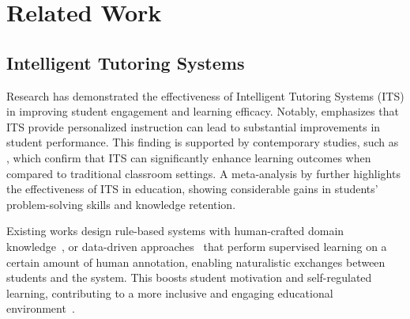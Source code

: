 \section{Related Work}
\subsection{Intelligent Tutoring Systems}
Research has demonstrated the effectiveness of Intelligent Tutoring Systems (ITS) in improving student engagement and learning efficacy. Notably, \cite{bloom} emphasizes that ITS provide personalized instruction can lead to substantial improvements in student performance. This finding is supported by contemporary studies, such as \cite{stern}, which confirm that ITS can significantly enhance learning outcomes when compared to traditional classroom settings. A meta-analysis by \cite{zhuang} further highlights the effectiveness of ITS in education, showing considerable gains in students' problem-solving skills and knowledge retention.

Existing works design rule-based systems with human-crafted domain knowledge~\cite{rule}, or data-driven approaches~\cite{domain,Miao} that perform supervised learning on a certain amount of human annotation, enabling naturalistic exchanges between students and the system. This boosts student motivation and self-regulated learning, contributing to a more inclusive and engaging educational environment~\cite{student_model}.





